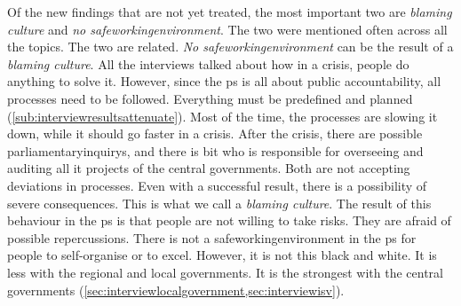 Of the new findings that are not yet treated, the most important two are \textit{blaming culture} and \textit{no \gls{safeworkingenvironment}}. The two were mentioned often across all the topics. The two are related. \textit{No \gls{safeworkingenvironment}} can be the result of a \textit{blaming culture}. All the interviews talked about how in a crisis, people do anything to solve it. However, since the \gls{ps} is all about public accountability, all processes need to be followed. Everything must be predefined and planned (\cref{sub:interviewresultsattenuate}). Most of the time, the processes are slowing it down, while it should go faster in a crisis. After the crisis, there are possible \glspl{parliamentaryinquiry}, and there is \acrshort{bit} who is responsible for overseeing and auditing all \acrshort{it} projects of the central governments. Both are not accepting deviations in processes. Even with a successful result, there is a possibility of severe consequences. This is what we call a \textit{blaming culture}. The result of this behaviour in the \gls{ps} is that people are not willing to take risks. They are afraid of possible repercussions. There is not a \gls{safeworkingenvironment} in the \gls{ps} for people to self-organise or to excel. However, it is not this black and white. It is less with the regional and local governments. It is the strongest with the central governments (\cref{sec:interviewlocalgovernment,sec:interviewisv}).
